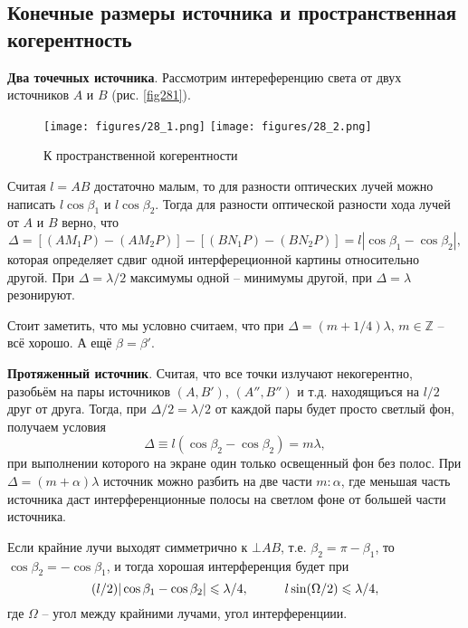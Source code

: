 \subsection{Конечные размеры источника и пространственная когерентность}


\textbf{Два точечных источника}.
Рассмотрим интереференцию света от двух источников $A$ и $B$ (рис. \eqref{fig281}). 
\begin{figure}[ht]
    \centering
    \texttt{[image: figures/28\_1.png]}
    \hspace{5 mm} 
    \texttt{[image: figures/28\_2.png]}
    \caption{К пространственной когерентности}
    \label{fig281}
\end{figure}
Считая $l=AB$ достаточно малым, то для разности оптических лучей можно написать $l\cos \beta_1$ и $l \cos \beta_2$. Тогда для разности оптической разности хода лучей от $A$ и $B$ верно, что
\begin{equation*}
    \Delta = 
    \left[(AM_1P)-(AM_2P)\right]-\left[(BN_1 P) - (BN_2P)\right]
   = l |\cos \beta_1 - \cos \beta_2|,
\end{equation*}
которая определяет сдвиг одной интерфереционной картины относительно другой. При $\Delta = \lambda/2$ максимумы одной -- минимумы другой, при $\Delta = \lambda$ резонируют. 

Стоит заметить, что мы условно считаем, что при $\Delta = (m+1/4)\lambda,\, m \in \mathbb{Z}$ -- всё хорошо. А ещё $\beta = \beta'$. 



\textbf{Протяженный источник}.  Считая, что все точки излучают некогерентно, разобьём на пары источников $(A, B'),\,  (A'', B'')$ и т.д. находящиъся на $l/2$ друг от друга. Тогда, при $\Delta/2 = \lambda/2$ от каждой пары будет просто светлый фон, получаем условия
\begin{equation*}
    \Delta \equiv l(\cos \beta_2 - \cos \beta_2) = m\lambda,
\end{equation*}
при выполнении которого на экране один только освещенный фон без полос. При $\Delta = (m+\alpha)\lambda$ источник можно разбить на две части $m \colon  \alpha$, где меньшая часть источника даст интерференционные полосы на светлом фоне от большей части источника. 

Если крайние лучи выходят симметрично к $\bot AB$, т.е. $\beta_2 = \pi-\beta_1$, то $\cos \beta_2 = - \cos \beta_1$, и тогда хорошая интерференция будет при
\begin{equation*}
    (l/2) |\cos\beta_1-\cos \beta_2| \leq \lambda/4,
    \hspace{10 mm} 
    l \sin (\Omega/2) \leq \lambda/4,
\end{equation*}
где $\Omega$ -- угол между крайними лучами, угол интерференциии. 


